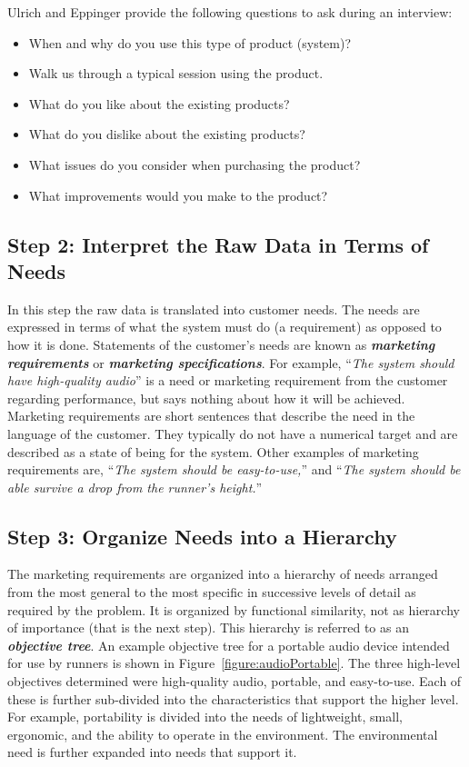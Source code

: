 Ulrich and Eppinger provide the following questions to ask during an
interview:

\begin{itemize}
\item
  When and why do you use this type of product (system)?
\item
  Walk us through a typical session using the product.
\item
  What do you like about the existing products?
\item
  What do you dislike about the existing products?
\item
  What issues do you consider when purchasing the product?
\item
  What improvements would you make to the product?
\end{itemize}

\subsection*{Step 2: Interpret the Raw Data in Terms of Needs}


In this step the raw data is translated into customer needs. The needs
are expressed in terms of what the system must do (a requirement) as
opposed to how it is done. Statements of the customer's needs are known
as \textbf{\emph{marketing requirements}} or \emph{\textbf{marketing
specifications}}. For example, ``\emph{The system should have
high-quality audio}'' is a need or marketing requirement from the
customer regarding performance, but says nothing about how it will be
achieved. Marketing requirements are short sentences that describe the
need in the language of the customer. They typically do not have a
numerical target and are described as a state of being for the system.
Other examples of marketing requirements are, ``\emph{The system should
be easy-to-use,}'' and ``\emph{The system should be able survive a drop
from the runner's height.}''

\subsection*{Step 3: Organize Needs into a Hierarchy}

The marketing requirements are organized into a hierarchy of needs
arranged from the most general to the most specific in successive levels
of detail as required by the problem. It is organized by functional
similarity, not as hierarchy of importance (that is the next step). This
hierarchy is referred to as an \emph{\textbf{objective tree}}. An
example objective tree for a portable audio device intended for use by
runners is shown in Figure~\ref{figure:audioPortable}. The three high-level objectives
determined were high-quality audio, portable, and easy-to-use. Each of
these is further sub-divided into the characteristics that support the
higher level. For example, portability is divided into the needs of
lightweight, small, ergonomic, and the ability to operate in the
environment. The environmental need is further expanded into needs that
support it.


